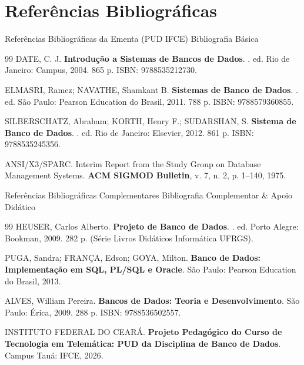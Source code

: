 \section{Referências Bibliográficas}

\begin{frame}{Referências Bibliográficas da Ementa (PUD IFCE)}
  \vspace{-0.2cm}
  \alert{Bibliografia Básica}\par
  \vspace{0.15cm}
  \begin{thebibliography}{99}
    \footnotesize
      DATE, C. J.
      \newblock \textbf{Introdução a Sistemas de Bancos de Dados}.
      . ed. Rio de Janeiro: Campus, 2004. 865 p. ISBN: 9788535212730.

      ELMASRI, Ramez; NAVATHE, Shamkant B.
      \newblock \textbf{Sistemas de Banco de Dados}.
      . ed. São Paulo: Pearson Education do Brasil, 2011. 788 p. ISBN: 9788579360855.

      SILBERSCHATZ, Abraham; KORTH, Henry F.; SUDARSHAN, S.
      \newblock \textbf{Sistema de Banco de Dados}.
      . ed. Rio de Janeiro: Elsevier, 2012. 861 p. ISBN: 9788535245356.

      ANSI/X3/SPARC.
      \newblock Interim Report from the Study Group on Database Management Systems.
      \newblock \textbf{ACM SIGMOD Bulletin}, v. 7, n. 2, p. 1--140, 1975.
  \end{thebibliography}
\end{frame}

\begin{frame}{Referências Bibliográficas Complementares}
  \vspace{-0.2cm}
  \alert{Bibliografia Complementar \& Apoio Didático}\par
  \vspace{0.15cm}
  \begin{thebibliography}{99}
    \footnotesize
      HEUSER, Carlos Alberto.
      \newblock \textbf{Projeto de Banco de Dados}.
      . ed. Porto Alegre: Bookman, 2009. 282 p. (Série Livros Didáticos Informática UFRGS).

      PUGA, Sandra; FRANÇA, Edson; GOYA, Milton.
      \newblock \textbf{Banco de Dados: Implementação em SQL, PL/SQL e Oracle}.
      \newblock São Paulo: Pearson Education do Brasil, 2013.

      ALVES, William Pereira.
      \newblock \textbf{Bancos de Dados: Teoria e Desenvolvimento}.
      \newblock São Paulo: Érica, 2009. 288 p. ISBN: 9788536502557.

      INSTITUTO FEDERAL DO CEARÁ.
      \newblock \textbf{Projeto Pedagógico do Curso de Tecnologia em Telemática: PUD da Disciplina de Banco de Dados}.
      \newblock Campus Tauá: IFCE, 2026.
  \end{thebibliography}
\end{frame}
